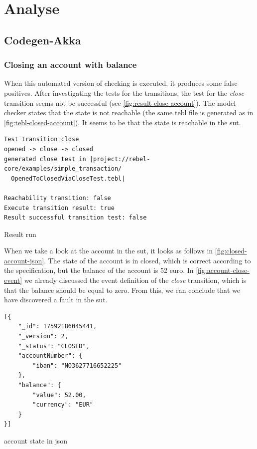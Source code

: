 \section{Analyse}

\subsection{Codegen-Akka}

\subsubsection{Closing an account with balance}\label{sec:bug-close-account}
When this automated version of checking is executed, it produces some false
positives. After investigating the tests for the transitions, the test for the \textit{close}
transition seems not be successful (see \autoref{fig:result-close-account}).
The model checker states that the state is not reachable (the same tebl file is
generated as in \autoref{fig:tebl-closed-account}). It seems to be that the
state is reachable in the \gls{sut}.

\begin{sourcecode}[h!]
\begin{lstlisting}[]
Test transition close
opened -> close -> closed
generated close test in |project://rebel-core/examples/simple_transaction/
  OpenedToClosedViaCloseTest.tebl|

Reachability transition: false
Execute transition result: true
Result successful transition test: false
\end{lstlisting}
\caption{Result run}\label{fig:result-close-account}
\end{sourcecode}
\FloatBarrier

When we take a look at the account in the \gls{sut}, it looks as
follows in \autoref{fig:closed-account-json}. The state of the account is in
closed, which is correct according to the specification, but the balance of the
account is 52 euro. In \autoref{fig:account-close-event} we already discussed
the event  definition of the \textit{close} transition, which is that the
balance should be equal to zero. From this, we can conclude that we have
discovered a fault in the \gls{sut}.

\begin{sourcecode}[h!]
\begin{lstlisting}[]
[{
	"_id": 17592186045441,
	"_version": 2,
	"_status": "CLOSED",
	"accountNumber": {
		"iban": "NO3627716652225"
	},
	"balance": {
		"value": 52.00,
		"currency": "EUR"
	}
}]
\end{lstlisting}
\caption{account state in json}\label{fig:closed-account-json}
\end{sourcecode}
\FloatBarrier

